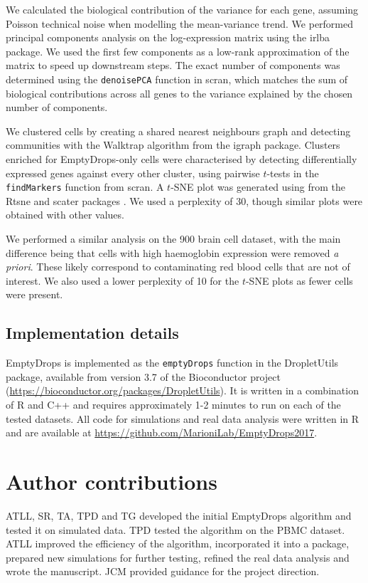 \documentclass[10pt,letterpaper]{article}
\newcommand{\code}[1]{\texttt{#1}}
\begin{document}
We calculated the biological contribution of the variance for each gene, assuming Poisson technical noise when modelling the mean-variance trend.
We performed principal components analysis on the log-expression matrix using the \textsf{irlba} package.
We used the first few components as a low-rank approximation of the matrix to speed up downstream steps.
The exact number of components was determined using the \code{denoisePCA} function in \textsf{scran},
which matches the sum of biological contributions across all genes to the variance explained by the chosen number of components.

We clustered cells by creating a shared nearest neighbours graph \cite{xu2015identification} and detecting communities with the Walktrap algorithm from the \textsf{igraph} package.
Clusters enriched for EmptyDrops-only cells were characterised by detecting differentially expressed genes against every other cluster,
using pairwise $t$-tests in the \code{findMarkers} function from \textsf{scran}.
A $t$-SNE plot \cite{van2008visualizing} was generated using from the \textsf{Rtsne} and \textsf{scater} packages \cite{mccarthy2017scater}.
We used a perplexity of 30, though similar plots were obtained with other values.

We performed a similar analysis on the 900 brain cell dataset, with the main difference being that cells with high haemoglobin expression were removed \textit{a priori}.
These likely correspond to contaminating red blood cells that are not of interest.
We also used a lower perplexity of 10 for the $t$-SNE plots as fewer cells were present.

\subsection*{Implementation details}
EmptyDrops is implemented as the \code{emptyDrops} function in the \textsf{DropletUtils} package, available from version 3.7 of the Bioconductor project (\url{https://bioconductor.org/packages/DropletUtils}).
It is written in a combination of R and C++ and requires approximately 1-2 minutes to run on each of the tested datasets.
All code for simulations and real data analysis were written in R and are available at \url{https://github.com/MarioniLab/EmptyDrops2017}.

\section*{Author contributions}
ATLL, SR, TA, TPD and TG developed the initial EmptyDrops algorithm and tested it on simulated data.
TPD tested the algorithm on the PBMC dataset.
ATLL improved the efficiency of the algorithm, incorporated it into a package, prepared new simulations for further testing, refined the real data analysis and wrote the manuscript.
JCM provided guidance for the project direction. 
\end{document}
